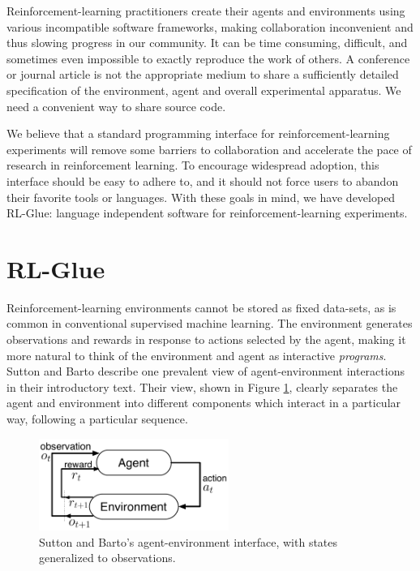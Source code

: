 \documentclass[twoside,11pt]{article}
\begin{document}
Reinforcement-learning practitioners create their agents and environments using various incompatible software frameworks, making collaboration inconvenient and thus slowing progress in our community.  It can be time consuming, difficult, and sometimes even impossible to exactly reproduce the work of others.  A conference or journal article is not the appropriate medium to share a sufficiently detailed specification of the environment, agent and overall experimental apparatus.  We need a convenient way to share source code.

We believe that a standard programming interface for reinforcement-learning experiments will remove some barriers to collaboration and accelerate the pace of research in reinforcement learning.  To encourage widespread adoption, this interface should be easy to adhere to, and it should not force users to abandon their favorite tools or languages.  With these goals in mind, we have developed RL-Glue: language independent software for reinforcement-learning experiments.


\vspace{-0.2cm}
\section{RL-Glue}
\vspace{-0.2cm}
Reinforcement-learning environments cannot be stored as fixed data-sets, as is common in conventional supervised machine learning.  The environment generates observations and rewards in response to actions selected by the agent, making it more natural to think of the environment and agent as interactive \textit{programs}.  Sutton and Barto describe one prevalent view of agent-environment interactions in their introductory text\citep{rlbook}.  Their view, shown in Figure \ref{fig:agent-env}, clearly separates the agent and environment into different components which interact in a particular way, following a particular sequence.   

\vspace{-0.4cm}
\begin{figure}[ht]
\begin{center}
\includegraphics[height=3cm]{figures/agent-env.pdf}
\vspace{-0.4cm}
\caption{\small Sutton and Barto's agent-environment interface, with states generalized to observations.}
\label{fig:agent-env}
\end{center}
\vspace{-0.7cm}
\end{figure}
\end{document}

